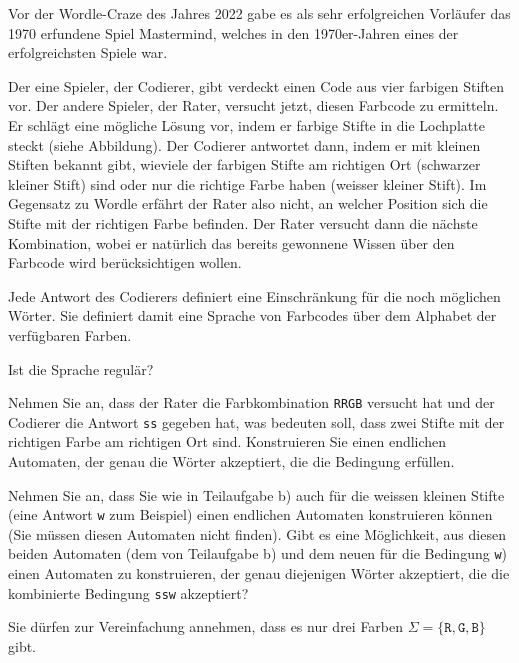 Vor der Wordle-Craze des Jahres 2022 gabe es als sehr erfolgreichen
Vorläufer das 1970 erfundene Spiel Mastermind, welches in den 1970er-Jahren
eines der erfolgreichsten Spiele war.
\begin{center}
\end{center}
Der eine Spieler, der Codierer, gibt verdeckt einen Code aus
vier farbigen Stiften vor.
Der andere Spieler, der Rater, versucht jetzt, diesen Farbcode zu ermitteln.
Er schlägt eine mögliche Lösung vor, indem er farbige Stifte in die 
Lochplatte steckt (siehe Abbildung).
Der Codierer antwortet dann, indem er mit kleinen Stiften bekannt gibt,
wieviele der farbigen Stifte am richtigen Ort (schwarzer kleiner Stift)
sind oder nur die richtige Farbe haben (weisser kleiner Stift).
Im Gegensatz zu Wordle erfährt der Rater also nicht, an welcher Position
sich die Stifte mit der richtigen Farbe befinden.
Der Rater versucht dann die nächste Kombination, wobei er natürlich das
bereits gewonnene Wissen über den Farbcode wird berücksichtigen wollen.

Jede Antwort des Codierers definiert eine Einschränkung für die noch
möglichen Wörter.
Sie definiert damit eine Sprache von Farbcodes über dem Alphabet
der verfügbaren Farben.

\begin{teilaufgaben}
\item
Ist die Sprache regulär?
\item
Nehmen Sie an, dass der Rater die Farbkombination \texttt{RRGB}
versucht hat und der Codierer die Antwort \texttt{ss} gegeben hat,
was bedeuten soll, dass zwei Stifte mit der richtigen Farbe am richtigen
Ort sind.
Konstruieren Sie einen endlichen Automaten, der
genau die Wörter akzeptiert, die die Bedingung erfüllen.
\item
Nehmen Sie an, dass Sie wie in Teilaufgabe b)
auch für die weissen kleinen Stifte (eine Antwort \texttt{w} zum Beispiel)
einen endlichen Automaten konstruieren können (Sie müssen diesen Automaten
nicht finden).
Gibt es eine Möglichkeit,
aus diesen beiden Automaten (dem von Teilaufgabe b) und dem neuen für die
Bedingung \texttt{w}) einen Automaten zu konstruieren, der genau
diejenigen Wörter akzeptiert, die die kombinierte Bedingung \texttt{ssw}
akzeptiert?
\end{teilaufgaben}

\begin{hinweis}
Sie dürfen zur Vereinfachung annehmen, dass es nur drei Farben
$\Sigma=\{\texttt{R},\texttt{G},\texttt{B}\}$ gibt.
\end{hinweis}

